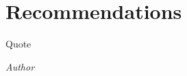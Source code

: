 \documentclass[class=report,11pt,crop=false]{standalone}
\begin{document}
\chapter{Recommendations}
\epigraph{Quote}%
    {\emph{Author}}








\ifstandalone

\fi
\end{document}
